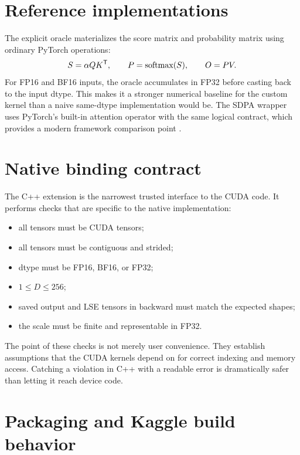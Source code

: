 \section{Reference implementations}

The explicit oracle materializes the score matrix and probability matrix using ordinary PyTorch operations:
\begin{equation}
  S = \alpha QK^{\mathsf T}, \qquad
  P = \operatorname{softmax}(S), \qquad
  O = PV.
\end{equation}
For FP16 and BF16 inputs, the oracle accumulates in FP32 before casting back to the input dtype. This makes it a stronger numerical baseline for the custom kernel than a naive same-dtype implementation would be. The SDPA wrapper uses PyTorch's built-in attention operator with the same logical contract, which provides a modern framework comparison point \citep{pytorch212sdpa}.

\section{Native binding contract}

The C++ extension is the narrowest trusted interface to the CUDA code. It performs checks that are specific to the native implementation:
\begin{itemize}
  \item all tensors must be CUDA tensors;
  \item all tensors must be contiguous and strided;
  \item dtype must be FP16, BF16, or FP32;
  \item $1 \le D \le 256$;
  \item saved output and LSE tensors in backward must match the expected shapes;
  \item the scale must be finite and representable in FP32.
\end{itemize}
The point of these checks is not merely user convenience. They establish assumptions that the CUDA kernels depend on for correct indexing and memory access. Catching a violation in C++ with a readable error is dramatically safer than letting it reach device code.

\section{Packaging and Kaggle build behavior}

